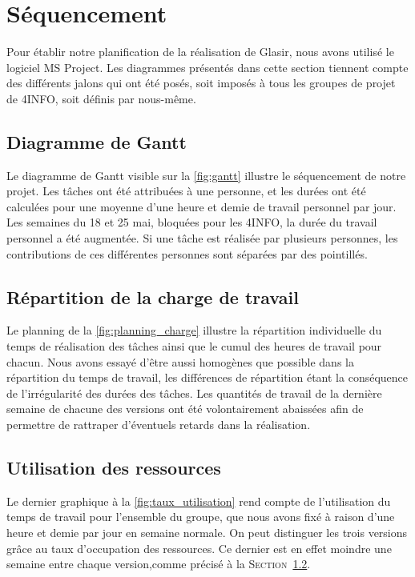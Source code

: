 \section{Séquencement}
	\label{sec:sequencement}
	Pour établir notre planification de la réalisation de Glasir, nous avons utilisé le logiciel MS Project. Les diagrammes présentés dans cette section tiennent compte des différents jalons qui ont été posés, soit imposés à tous les groupes de projet de 4INFO, soit définis par nous-même.

    \subsection{Diagramme de Gantt}
        Le diagramme de Gantt visible sur la \ffigure{} \ref{fig:gantt} illustre le séquencement de notre projet. Les tâches ont été attribuées à une personne, et les durées ont été calculées pour une moyenne d'une heure et demie de travail personnel par jour. Les semaines du 18 et 25 mai, bloquées pour les 4INFO, la durée du travail personnel a été augmentée. Si une tâche est réalisée par plusieurs personnes, les contributions de ces différentes personnes sont séparées par des pointillés.
    
    \subsection{Répartition de la charge de travail}
    \label{subsec:repartition_charge}
        Le planning de la \ffigure{} \ref{fig:planning_charge} illustre la répartition individuelle du temps de réalisation des tâches ainsi que le cumul des heures de travail pour chacun. Nous avons essayé d'être aussi homogènes que possible dans la répartition du temps de travail, les différences de répartition étant la conséquence de l'irrégularité des durées des tâches. Les quantités de travail de la dernière semaine de chacune des versions ont été volontairement abaissées afin de permettre de rattraper d'éventuels retards dans la réalisation.

    \subsection{Utilisation des ressources}
		Le dernier graphique à la \ffigure{} \ref{fig:taux_utilisation} rend compte de l'utilisation du temps de travail pour l'ensemble du groupe, que nous avons fixé à raison d'une heure et demie par jour en semaine normale. On peut distinguer les trois versions grâce au taux d'occupation des ressources. Ce dernier est en effet moindre une semaine entre chaque version,comme précisé à la \textsc{Section}~\ref{subsec:repartition_charge}.

